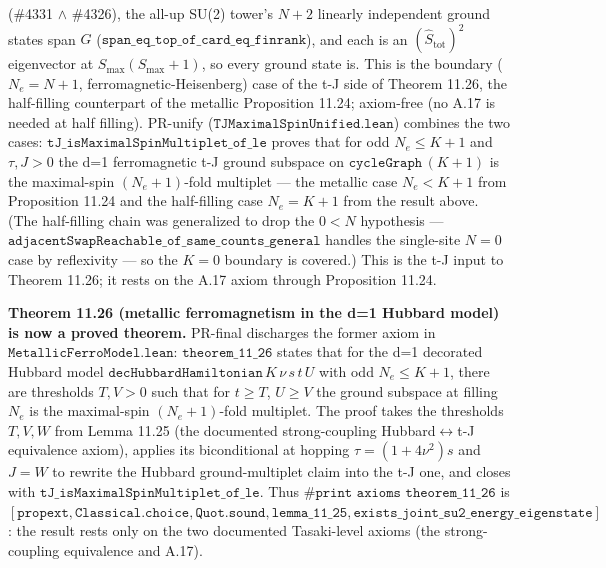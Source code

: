 \documentclass[a4paper,11pt]{article}
\begin{document}
(\#4331 $\wedge$ \#4326), the all-up SU(2) tower's $N{+}2$ linearly independent ground states span $G$
($\texttt{span\_eq\_top\_of\_card\_eq\_finrank}$), and each is an $(\hat S_{\mathrm{tot}})^2$
eigenvector at $S_{\max}(S_{\max}{+}1)$, so every ground state is.  This is the boundary
($N_e=N{+}1$, ferromagnetic-Heisenberg) case of the t-J side of Theorem 11.26, the half-filling
counterpart of the metallic Proposition 11.24; axiom-free (no A.17 is needed at half filling).
PR-unify ($\texttt{TJMaximalSpinUnified.lean}$) combines the two cases:
$\texttt{tJ\_isMaximalSpinMultiplet\_of\_le}$ proves that for odd $N_e\le K{+}1$ and $\tau,J>0$ the
d=1 ferromagnetic t-J ground subspace on $\texttt{cycleGraph}\,(K{+}1)$ is the maximal-spin
$(N_e{+}1)$-fold multiplet --- the metallic case $N_e<K{+}1$ from Proposition 11.24 and the
half-filling case $N_e=K{+}1$ from the result above.  (The half-filling chain was generalized to drop
the $0<N$ hypothesis --- $\texttt{adjacentSwapReachable\_of\_same\_counts\_general}$ handles the
single-site $N=0$ case by reflexivity --- so the $K=0$ boundary is covered.)  This is the t-J input to
Theorem 11.26; it rests on the A.17 axiom through Proposition 11.24.

\medskip\noindent\textbf{Theorem 11.26 (metallic ferromagnetism in the d=1 Hubbard model) is now a
proved theorem.}  PR-final discharges the former axiom in $\texttt{MetallicFerroModel.lean}$:
$\texttt{theorem\_11\_26}$ states that for the d=1 decorated Hubbard model
$\texttt{decHubbardHamiltonian}\,K\,\nu\,s\,t\,U$ with odd $N_e\le K{+}1$, there are thresholds
$T,V>0$ such that for $t\ge T$, $U\ge V$ the ground subspace at filling $N_e$ is the maximal-spin
$(N_e{+}1)$-fold multiplet.  The proof takes the thresholds $T,V,W$ from Lemma 11.25 (the documented
strong-coupling Hubbard$\leftrightarrow$t-J equivalence axiom), applies its biconditional at hopping
$\tau=(1+4\nu^2)s$ and $J=W$ to rewrite the Hubbard ground-multiplet claim into the t-J one, and
closes with $\texttt{tJ\_isMaximalSpinMultiplet\_of\_le}$.  Thus
$\texttt{\#print axioms theorem\_11\_26}$ is
$[\texttt{propext},\texttt{Classical.choice},\texttt{Quot.sound},\texttt{lemma\_11\_25},
\texttt{exists\_joint\_su2\_energy\_eigenstate}]$: the result rests only on the two documented
Tasaki-level axioms (the strong-coupling equivalence and A.17).
\end{document}
